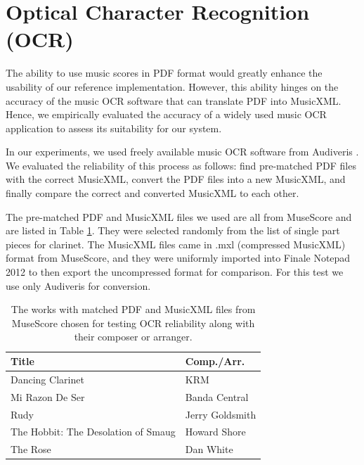 \documentclass[12pt]{report}
\begin{document}
\section{Optical Character Recognition (OCR)}
\label{sec:ocr}

The ability to use music scores in PDF format would greatly enhance the usability of our reference implementation. However, this ability hinges on the accuracy of the music OCR software that can translate PDF into MusicXML. Hence, we empirically evaluated the accuracy of a widely used music OCR application to assess its suitability for our system. 

In our experiments, we used freely available music OCR software from Audiveris \cite{Audiveris}. We evaluated the reliability of this process as follows: find pre-matched PDF files with the correct MusicXML, convert the PDF files into a new MusicXML, and finally compare the correct and converted MusicXML to each other.

The pre-matched PDF and MusicXML files we used are all from MuseScore \cite{MuseScore} and are listed in Table \ref{table:matched}. They were selected randomly from the list of single part pieces for clarinet. The MusicXML files came in .mxl (compressed MusicXML) format from MuseScore, and they were uniformly imported into Finale Notepad 2012 \cite{FinaleNotepad} to then export the uncompressed format for comparison. For this test we use only Audiveris for conversion.
 
\begin{table}[ht!]
	\centering
	\caption{The works with matched PDF and MusicXML files from MuseScore chosen for testing OCR reliability along with their composer or arranger.}
    \begin{tabular}{| l | l |}
        \hline
    Title & Comp./Arr. \\ \hline
    Dancing Clarinet & KRM \\ \hline
	Mi Razon De Ser & Banda Central \\ \hline
	Rudy & Jerry Goldsmith \\ \hline
	The Hobbit: The Desolation of Smaug & Howard Shore \\ \hline
	The Rose & Dan White \\
        \hline
    \end{tabular}
	\label{table:matched}
\end{table} 

\end{document}
